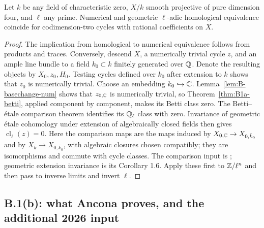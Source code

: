 \begin{theorem}\label{thm:B1a-etale}
Let $k$ be any field of characteristic zero, $X/k$ smooth projective of
pure dimension four, and $\ell$ any prime. Numerical and geometric
$\ell$-adic homological equivalence coincide for codimension-two cycles
with rational coefficients on $X$.
\end{theorem}
\begin{proof}
The implication from homological to numerical equivalence follows from
products and traces. Conversely, descend $X$, a numerically trivial cycle
$z$, and an ample line bundle to a field $k_0\subset k$ finitely generated
over ${\mathbb{Q}}$. Denote the resulting objects by $X_0,z_0,H_0$.
Testing cycles defined over $k_0$ after extension to $k$ shows that $z_0$
is numerically trivial. Choose an embedding $k_0\hookrightarrow{\ensuremath{\mathbb{C}}}$.
Lemma~\ref{lem:B-basechange-num} shows that $z_{0,{\mathbb{C}}}$ is numerically
trivial, so Theorem~\ref{thm:B1a-betti}, applied component by component,
makes its Betti class zero. The Betti--\'etale comparison theorem
identifies its ${\mathbb{Q}}_\ell$ class with zero. Invariance of geometric
\'etale cohomology under extension of algebraically closed fields then
gives $\operatorname{cl}_\ell(z)=0$.
Here the comparison maps are the maps induced by
$X_{0,{\mathbb{C}}}\to X_{0,\bar k_0}$ and by
$X_{\bar k}\to X_{0,\bar k_0}$, with algebraic closures chosen compatibly;
they are isomorphisms and commute with cycle classes.
The comparison input is \cite[Expos\'e XVI, Th\'eor\`eme 4.1]{BSGA4XVI};
geometric extension invariance is its Corollary 1.6. Apply these first
to ${\mathbb{Z}}/\ell^n$ and then pass to inverse limits and invert $\ell$.
\end{proof}

\subsection{B.1(b): what Ancona proves, and the additional 2026 input}

